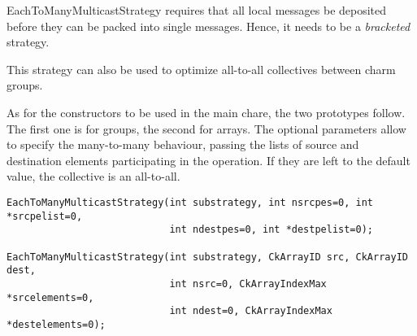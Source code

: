 {%

EachToManyMulticastStrategy requires that all local messages be deposited
before they can be packed into single messages. Hence, it needs to be a {\em
bracketed} strategy.

This strategy can also be used to optimize all-to-all collectives between charm
groups.




As for the constructors to be used in the main chare, the two prototypes follow.
The first one is for groups, the second for arrays. The optional parameters
allow to specify the many-to-many behaviour, passing the lists of source and
destination elements participating in the operation. If they are left to the
default value, the collective is an all-to-all.

\begin{verbatim}
EachToManyMulticastStrategy(int substrategy, int nsrcpes=0, int *srcpelist=0,
                            int ndestpes=0, int *destpelist=0);

EachToManyMulticastStrategy(int substrategy, CkArrayID src, CkArrayID dest,
                            int nsrc=0, CkArrayIndexMax *srcelements=0,
                            int ndest=0, CkArrayIndexMax *destelements=0);
\end{verbatim}

}
